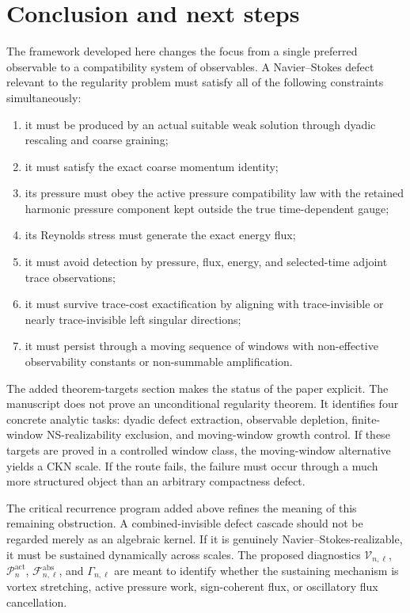 \documentclass[11pt]{article}
\numberwithin{equation}{section}
\theoremstyle{plain}
\theoremstyle{definition}
\theoremstyle{remark}
\newcommand{\Vort}{\mathcal V}
\newcommand{\Flux}{\mathcal F}
\newcommand{\Press}{\mathcal P}
\newcommand{\act}{\mathrm{act}}
\newcommand{\absop}{\mathrm{abs}}
\begin{document}
\section{Conclusion and next steps}
\label{sec:conclusion}

The framework developed here changes the focus from a single preferred observable to a compatibility system of observables.  A Navier--Stokes defect relevant to the regularity problem must satisfy all of the following constraints simultaneously:
\begin{enumerate}
  \item it must be produced by an actual suitable weak solution through dyadic rescaling and coarse graining;
  \item it must satisfy the exact coarse momentum identity;
  \item its pressure must obey the active pressure compatibility law with the retained harmonic pressure component kept outside the true time-dependent gauge;
  \item its Reynolds stress must generate the exact energy flux;
  \item it must avoid detection by pressure, flux, energy, and selected-time adjoint trace observations;
  \item it must survive trace-cost exactification by aligning with trace-invisible or nearly trace-invisible left singular directions;
  \item it must persist through a moving sequence of windows with non-effective observability constants or non-summable amplification.
\end{enumerate}

The added theorem-targets section makes the status of the paper explicit.  The manuscript does not prove an unconditional regularity theorem.  It identifies four concrete analytic tasks: dyadic defect extraction, observable depletion, finite-window NS-realizability exclusion, and moving-window growth control.  If these targets are proved in a controlled window class, the moving-window alternative yields a CKN scale.  If the route fails, the failure must occur through a much more structured object than an arbitrary compactness defect.

The critical recurrence program added above refines the meaning of this remaining obstruction.  A combined-invisible defect cascade should not be regarded merely as an algebraic kernel.  If it is genuinely Navier--Stokes-realizable, it must be sustained dynamically across scales.  The proposed diagnostics \(\Vort_{n,\ell}\), \(\Press^{\act}_n\), \(\Flux^{\absop}_{n,\ell}\), and \(\Gamma_{n,\ell}\) are meant to identify whether the sustaining mechanism is vortex stretching, active pressure work, sign-coherent flux, or oscillatory flux cancellation.
\end{document}
